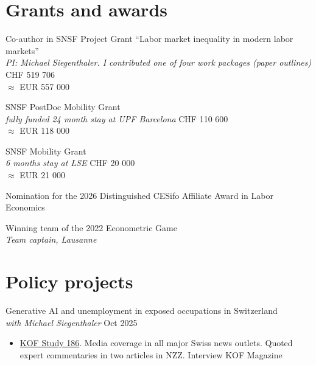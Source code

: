 \documentclass[letter, 11pt]{res}
\begin{document}
\begin{resume}
\clearpage

\vspace{0.5cm}
\section{Grants and awards}
\vspace{0.5cm}


Co-author in SNSF Project Grant ``Labor market inequality in modern labor markets''\\
{\sl PI: Michael Siegenthaler. I contributed one of four work packages (paper outlines)} \hfill CHF 519 706\\
\vspace{0cm}\hfill $\approx$  EUR 557 000

SNSF PostDoc Mobility Grant \\
{\sl fully funded 24 month stay at UPF Barcelona} \hfill CHF 110 600\\
\vspace{0cm} \hfill $\approx$  EUR 118 000



SNSF Mobility Grant \\
{\sl 6 months stay at LSE} \hfill CHF 20 000\\
\vspace{0cm}\hfill $\approx$  EUR 21 000

Nomination for the 2026 Distinguished CESifo Affiliate Award in Labor Economics

Winning team of the 2022 Econometric Game \\
{\sl Team captain, Lausanne}


\vspace{0.5cm}



\vspace{0.5cm}
\section{Policy projects}
\vspace{0.5cm}

Generative AI and unemployment in exposed occupations in Switzerland\\
{\sl with Michael Siegenthaler} \hfill Oct 2025
\begin{itemize}[topsep=0pt]
\item \href{https://kof.ethz.ch/content/dam/ethz/special-interest/dual/kof-dam/documents/newsletter/KOF_Studie_KI_Schweizer_Arbeitsmarkt.pdf}{KOF Study 186}. Media coverage in all major Swiss news outlets. Quoted expert commentaries in two articles in NZZ. Interview KOF Magazine 


\end{itemize}
\end{resume}
\end{document}
